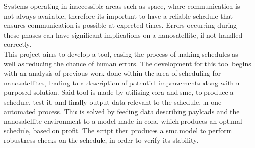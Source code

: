 Systems operating in inaccessible areas such as space, where communication is not always available, therefore its important to have a reliable schedule that ensures communication is possible at expected times. Errors occurring during these phases can have significant implications on a nanosatellite, if not handled correctly.\\
This project aims to develop a tool, easing the process of making schedules as well as reducing the chance of human errors. The development for this tool begins with an analysis of previous work done within the area of scheduling for nanosatellites, leading to a description of potential improvements along with a purposed solution. Said tool is made by utilising \acrshort{cora} and \acrshort{smc}, to produce a schedule, test it, and finally output data relevant to the schedule, in one automated process. This is solved by feeding data describing payloads and the nanosatellite environment to a model made in \acrshort{cora}, which produces an optimal schedule, based on profit. The script then produces a \acrshort{smc} model to perform robustness checks on the schedule, in order to verify its stability.

\glsresetall